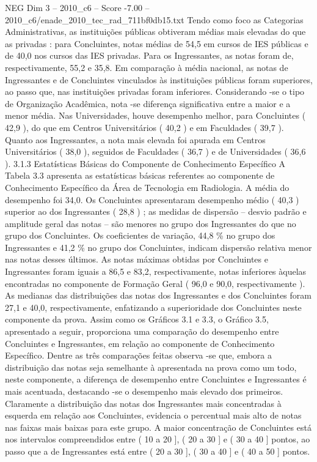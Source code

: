 \begin{textsample}{NEG Dim 3 – 2010\_c6 – Score -7.00 – 2010\_c6/enade\_2010\_tec\_rad\_711bf0db15.txt}
Tendo como foco as Categorias Administrativas, as instituições públicas obtiveram médias mais elevadas do que as privadas : para Concluintes, notas médias de 54,5 em cursos de IES públicas e de 40,0 nos cursos das IES privadas.
Para os Ingressantes, as notas foram de, respectivamente, 55,2 e 35,8.
Em comparação à média nacional, as notas de Ingressantes e de Concluintes vinculados às instituições públicas foram superiores, ao passo que, nas instituições privadas foram inferiores.
Considerando -se o tipo de Organização Acadêmica, nota -se diferença significativa entre a maior e a menor média.
Nas Universidades, houve desempenho melhor, para Concluintes ( 42,9 ), do que em Centros Universitários ( 40,2 ) e em Faculdades ( 39,7 ).
Quanto aos Ingressantes, a nota mais elevada foi apurada em Centros Universitários ( 38,0 ), seguidos de Faculdades ( 36,7 ) e de Universidades ( 36,6 ). 3.1.3 Estatísticas Básicas do Componente de Conhecimento Específico A Tabela 3.3 apresenta as estatísticas básicas referentes ao componente de Conhecimento Específico da Área de Tecnologia em Radiologia.
A média do desempenho foi 34,0.
Os Concluintes apresentaram desempenho médio ( 40,3 ) superior ao dos Ingressantes ( 28,8 ) ; as medidas de dispersão – desvio padrão e amplitude geral das notas – são menores no grupo dos Ingressantes do que no grupo dos Concluintes.
Os coeficientes de variação, 44,8 \% no grupo dos Ingressantes e 41,2 \% no grupo dos Concluintes, indicam dispersão relativa menor nas notas desses últimos.
As notas máximas obtidas por Concluintes e Ingressantes foram iguais a 86,5 e 83,2, respectivamente, notas inferiores àquelas encontradas no componente de Formação Geral ( 96,0 e 90,0, respectivamente ).
As medianas das distribuições das notas dos Ingressantes e dos Concluintes foram 27,1 e 40,0, respectivamente, enfatizando a superioridade dos Concluintes neste componente da prova.
Assim como os Gráficos 3.1 e 3.3, o Gráfico 3.5, apresentado a seguir, proporciona uma comparação do desempenho entre Concluintes e Ingressantes, em relação ao componente de Conhecimento Específico.
Dentre as três comparações feitas observa -se que, embora a distribuição das notas seja semelhante à apresentada na prova como um todo, neste componente, a diferença de desempenho entre Concluintes e Ingressantes é mais acentuada, destacando -se o desempenho mais elevado dos primeiros.
Claramente a distribuição das notas dos Ingressantes mais concentradas à esquerda em relação aos Concluintes, evidencia o percentual mais alto de notas nas faixas mais baixas para este grupo.
A maior concentração de Concluintes está nos intervalos compreendidos entre ( 10 a 20 ], ( 20 a 30 ] e ( 30 a 40 ] pontos, ao passo que a de Ingressantes está entre ( 20 a 30 ], ( 30 a 40 ] e ( 40 a 50 ] pontos.

\end{textsample}
